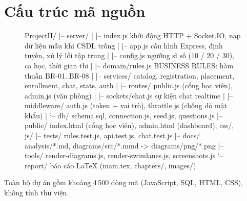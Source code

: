 \section{Cấu trúc mã nguồn}
\begin{figure}[H]
\begin{PlainCode}
ProjectII/
|-- server/
|   |-- index.js            khởi động HTTP + Socket.IO, nạp dữ liệu mẫu khi CSDL trống
|   |-- app.js              cấu hình Express, định tuyến, xử lý lỗi tập trung
|   |-- config.js           ngưỡng sĩ số (10 / 20 / 30), ca học, thời gian thi
|   |-- domain/rules.js     BUSINESS RULES: hàm thuần BR-01..BR-08
|   |-- services/           catalog, registration, placement, enrollment, chat, stats, auth
|   |-- routes/             public.js (cổng học viên), admin.js (văn phòng)
|   |-- sockets/chat.js     sự kiện chat realtime
|   |-- middleware/         auth.js (token + vai trò), throttle.js (chống dò mật khẩu)
|   `-- db/                 schema.sql, connection.js, seed.js, questions.js
|-- public/                 index.html (cổng học viên), admin.html (dashboard), css/, js/
|-- tests/                  rules.test.js, api.test.js, chat.test.js
|-- docs/                   analysis/*.md, diagrams/src/*.mmd -> diagrams/png/*.png
|-- tools/                  render-diagrams.js, render-swimlanes.js, screenshots.js
`-- report/                 báo cáo LaTeX (main.tex, chapters/, images/)
\end{PlainCode}
\label{lst:tree}
\end{figure}
Toàn bộ dự án gồm khoảng 4\,500 dòng mã (JavaScript, SQL, HTML, CSS), không tính thư viện.

